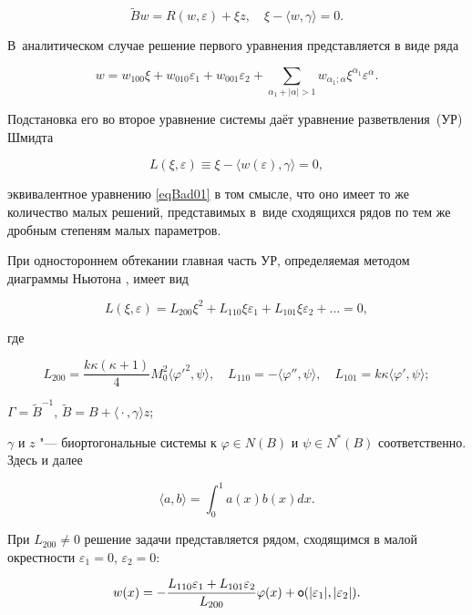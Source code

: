$$

\tilde{B}w=R(w,\varepsilon)+\xi z,\quad \xi-\langle w,\gamma\rangle=0.

$$ 

В~аналитическом случае решение первого уравнения представляется в виде ряда

 $$ 

 w=w_{100}\xi+w_{010}\varepsilon_1+w_{001}\varepsilon_2+\sum_{\alpha_1+|\alpha|>1} w_{\alpha_1;\alpha}\xi^{\alpha_1}\varepsilon^{\alpha}.

 $$

Подстановка его во второе уравнение системы даёт уравнение разветвления~(УР) Шмидта  

$$L(\xi,\varepsilon)\equiv\xi-\langle w(\varepsilon),\gamma\rangle=0,$$ 

эквивалентное уравнению \eqref{eqBad01} в том смысле, что оно имеет то же количество малых решений, представимых в~виде сходящихся рядов по тем же дробным степеням малых параметров.



При одностороннем обтекании главная часть УР, определяемая методом диаграммы Ньютона \cite{badokinate:bib:VAT}, имеет вид

$$L(\xi,\varepsilon)=L_{200}\xi^2 +L_{110}\xi\varepsilon_1+L_{101}\xi\varepsilon_2+\ldots=0,$$

где

$$L_{200}=\frac{k\kappa(\kappa+1)}{4}M_0^2\langle\varphi'^2, \psi\rangle,

\quad 

L_{110}=-\langle\varphi'',\psi\rangle, \quad 

L_{101}=k\kappa\langle\varphi',\psi\rangle;$$ 

$\Gamma =\tilde{B}^{-1}$, $\tilde{B}=B+ \langle{}\cdot{}, \gamma\rangle z$; 

$\gamma$ и $z$ "--- биортогональные системы к $\varphi\in N(B)$ и $\psi\in N^*(B)$ соответственно. Здесь и далее 

$$\langle a,b\rangle=\int_0^1 a(x)b(x)dx.$$



При $L_{200} \neq 0$ решение задачи представляется рядом, сходящимся в малой окрестности $\varepsilon_1=0$, $\varepsilon_2=0$:

$$

w(x)=-\frac{L_{110}\varepsilon_1+L_{101}\varepsilon_2}{L_{200}}\varphi(x)+{\sf o} 

(|\varepsilon_1|,|\varepsilon_2|).

$$ 


